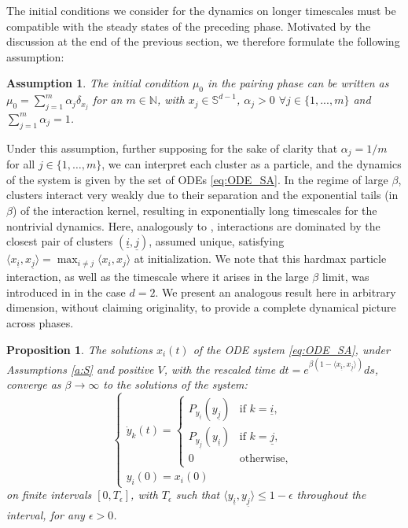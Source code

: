 \documentclass{article}
\numberwithin{theorem}{section}
\newtheorem{proposition}[theorem]{Proposition}
\newtheorem{assumption}{Assumption}
\begin{document}
The initial conditions we consider for the dynamics on longer timescales must be compatible with the steady states of the preceding phase. Motivated by the discussion at the end of the previous section, we therefore formulate the following assumption:
\begin{assumption}
 The initial condition $\mu_0$ in the pairing phase can be written as $\mu_0 = \sum_{j = 1}^m \alpha_j \delta_{x_j}$ for an $m \in \mathbb N$, with $x_j \in \mathbb S^{d-1}$, $\alpha_j >0$ $\forall{j\in\{1,...,m\}}$ and  $\sum_{j=1}^m \alpha_j =1$.
\end{assumption}
Under this assumption, further supposing for the sake of clarity that $\alpha_j = 1/m$ for all $j \in \{1, \dots, m\}$, we can interpret each cluster as a particle, and the dynamics of the system is given by the set of ODEs \eqref{eq:ODE_SA}. In the regime of large $\beta$, clusters interact very weakly due to their separation and the exponential tails (in $\beta$) of the interaction kernel, resulting in exponentially long timescales for the nontrivial dynamics. Here, analogously to  \cite{alcalde2025clustering}, interactions are dominated by the closest pair of clusters $(\underline{i}, \underline{j})$, assumed unique, satisfying 
$
\langle x_{\underline{i}}, x_{\underline{j}} \rangle = \max_{i \neq j} \langle x_i, x_j \rangle
$
at initialization. We note that this hardmax particle interaction, as well as the timescale where it arises in the large $\beta$ limit, was introduced in \cite[Section 6]{geshkovski2024dynamic} in the case $d =2$. We present an analogous result here in arbitrary dimension, without claiming originality, to provide a complete dynamical picture across phases.  
\begin{proposition}
\label{prop:pairwise_clustering}
The solutions $x_i(t)$ of the ODE system \eqref{eq:ODE_SA}, under Assumptions \ref{a:S} and positive $V$, with the rescaled time $dt = e^{\beta(1 - \langle x_{\underline{i}}, x_{\underline{j}} \rangle)} ds$, converge as $\beta \to \infty$ to the solutions of the system:
\[
\begin{cases}
\dot{y}_k(t) = 
\begin{cases} 
P_{y_{\underline{i}}}(y_{\underline{j}}) & \text{if } k = \underline{i}, \\
P_{y_{\underline{j}}}(y_{\underline{i}}) & \text{if } k = \underline{j}, \\
0 & \text{otherwise},
\end{cases} \\
y_i(0) = x_i(0)
\end{cases}
\]
on finite intervals $[0, T_\epsilon]$, with $T_\epsilon$ such that $\langle y_{\underline{i}}, y_{\underline{j}} \rangle \leq 1 - \epsilon$ throughout the interval, for any $\epsilon > 0$.
\end{proposition}
\end{document}
